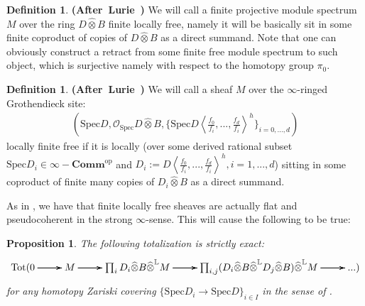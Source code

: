 \documentclass[12pt]{amsart}
\newtheorem{proposition}[theorem]{Proposition}
\theoremstyle{definition}
\newtheorem{definition}[theorem]{Definition}
\numberwithin{equation}{section}
\begin{document}
\begin{definition} \mbox{\bf{(After Lurie \cite[Definition 2.9.1.1]{Lu1})}} We will call a finite projective module spectrum $M$ over the ring $D\widehat{\otimes}B$ finite locally free, namely it will be basically sit in some finite coproduct of copies of $D\widehat{\otimes}B$ as a direct summand. Note that one can obviously construct a retract from some finite free module spectrum to such object, which is surjective namely with respect to the homotopy group $\pi_0$.
	
\end{definition}


\begin{definition} \mbox{\bf{(After Lurie \cite[Definition 2.9.1.1]{Lu1})}} We will call a sheaf $M$ over the $\infty$-ringed Grothendieck site:
\begin{align}
(\mathrm{Spec}D,\mathcal{O}_\mathrm{Spec}D\widehat{\otimes}B,\{\mathrm{Spec}D\left<\frac{f_0}{f_i},...,\frac{f_d}{f_i}\right>^h\}_{i=0,...,d})	
\end{align}
locally finite free if it is locally (over some derived rational subset $\mathrm{Spec}D_i\in \infty-\mathbf{Comm}^\mathrm{op}$ and $D_i:=D\left<\frac{f_0}{f_i},...,\frac{f_d}{f_i}\right>^h,i=1,...,d$) sitting in some coproduct of finite many copies of $D_i\widehat{\otimes}B$ as a direct summand. 
	
\end{definition}




\indent As in \cite[Proposition 7.2.4.20]{Lu2}, we have that finite locally free sheaves are actually flat and pseudocoherent in the strong $\infty$-sense. This will cause the following to be true:



\begin{proposition} 
The following totalization is strictly exact:
\[
\xymatrix@C+0pc@R+0pc{
\mathrm{Tot}(0  \ar[r]\ar[r]\ar[r] &M \ar[r]\ar[r]\ar[r] & \prod_i D_i\widehat{\otimes} B \widehat{\otimes}^\mathbb{L} M  \ar[r]\ar[r]\ar[r] &\prod_{i,j} (D_i\widehat{\otimes} B \widehat{\otimes}^\mathbb{L} D_j\widehat{\otimes}B) \widehat{\otimes}^\mathbb{L} M\ar[r]\ar[r]\ar[r] &...)
}
\]
for any homotopy Zariski covering $\{\mathrm{Spec}D_i\rightarrow \mathrm{Spec}D\}_{i\in I}$ in the sense of \cite[Theorem 2.15, Theorem 4.15]{BK1}. 
\end{proposition}
\end{document}
